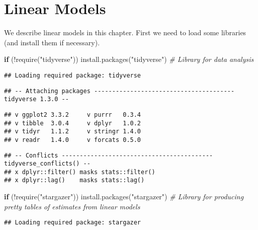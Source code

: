 \documentclass[
]{book}
\newenvironment{Shaded}{\begin{snugshade}}{\end{snugshade}}
\newcommand{\CommentTok}[1]{\textcolor[rgb]{0.56,0.35,0.01}{\textit{#1}}}
\newcommand{\ControlFlowTok}[1]{\textcolor[rgb]{0.13,0.29,0.53}{\textbf{#1}}}
\newcommand{\FunctionTok}[1]{\textcolor[rgb]{0.00,0.00,0.00}{#1}}
\newcommand{\NormalTok}[1]{#1}
\newcommand{\SpecialCharTok}[1]{\textcolor[rgb]{0.00,0.00,0.00}{#1}}
\newcommand{\StringTok}[1]{\textcolor[rgb]{0.31,0.60,0.02}{#1}}
\begin{document}
\hypertarget{linear-models}{%
\chapter{Linear Models}\label{linear-models}}

We describe linear models in this chapter. First we need to load some libraries (and install them if necessary).

\begin{Shaded}
\begin{Highlighting}[]
\ControlFlowTok{if}\NormalTok{ (}\SpecialCharTok{!}\FunctionTok{require}\NormalTok{(}\StringTok{"tidyverse"}\NormalTok{)) }\FunctionTok{install.packages}\NormalTok{(}\StringTok{"tidyverse"}\NormalTok{) }\CommentTok{\# Library for data analysis}
\end{Highlighting}
\end{Shaded}

\begin{verbatim}
## Loading required package: tidyverse
\end{verbatim}

\begin{verbatim}
## -- Attaching packages --------------------------------------- tidyverse 1.3.0 --
\end{verbatim}

\begin{verbatim}
## v ggplot2 3.3.2     v purrr   0.3.4
## v tibble  3.0.4     v dplyr   1.0.2
## v tidyr   1.1.2     v stringr 1.4.0
## v readr   1.4.0     v forcats 0.5.0
\end{verbatim}

\begin{verbatim}
## -- Conflicts ------------------------------------------ tidyverse_conflicts() --
## x dplyr::filter() masks stats::filter()
## x dplyr::lag()    masks stats::lag()
\end{verbatim}

\begin{Shaded}
\begin{Highlighting}[]
\ControlFlowTok{if}\NormalTok{ (}\SpecialCharTok{!}\FunctionTok{require}\NormalTok{(}\StringTok{"stargazer"}\NormalTok{)) }\FunctionTok{install.packages}\NormalTok{(}\StringTok{"stargazer"}\NormalTok{) }\CommentTok{\# Library for producing pretty tables of estimates from linear models}
\end{Highlighting}
\end{Shaded}

\begin{verbatim}
## Loading required package: stargazer
\end{verbatim}
\end{document}
